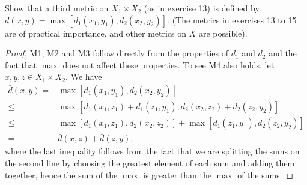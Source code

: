 \begin{exercise}{15}
Show that a third metric on $X_1\times X_2$ (as in exercise 13) is defined by $\bar{d}(x,y)=\max[d_1(x_1,y_1),d_2(x_2,y_2)]$. (The metrics in exercises 13 to 15 are of practical importance, and other metrics on $X$ are possible).
\end{exercise}
\begin{proof}
M1, M2 and M3 follow directly from the properties of $d_1$ and $d_2$ and the fact that $\max$ does not affect these properties. To see M4 also holds, let $x,y,z\in X_1\times X_2$. We have
\begin{align*}
    \bar{d}(x,y) 
    =& \max[d_1(x_1,y_1),d_2(x_2,y_2)]\\
    \leq& \max[d_1(x_1,z_1)+d_1(z_1,y_1),d_2(x_2,z_2)+d_2(z_2,y_2)]\\
    \leq& \max[d_1(x_1,z_1),d_2(x_2,z_2)]
    + \max[d_1(z_1,y_1), d_2(z_2,y_2)]\\
    =& \bar{d}(x,z)+\bar{d}(z,y),
\end{align*}
where the last inequality follows from the fact that we are splitting the sums on the second line by choosing the greatest element of each sum and adding them together, hence the sum of the $\max$ is greater than the $\max$ of the sums.
\end{proof}
